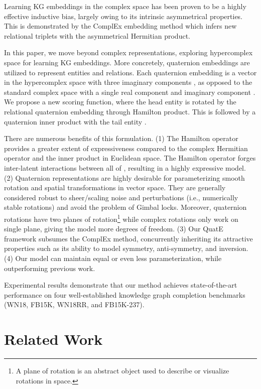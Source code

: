 \documentclass{article}
\begin{document}
Learning KG embeddings in the complex space  has been proven to be a highly effective inductive bias, largely owing to its intrinsic asymmetrical properties. This is demonstrated by the ComplEx embedding method which infers new relational triplets with the asymmetrical Hermitian product.

In this paper, we move beyond complex representations, exploring hypercomplex space for learning KG embeddings. More concretely, quaternion embeddings are utilized to represent entities and relations. Each quaternion embedding is a vector in the hypercomplex space  with three imaginary components , as opposed to the standard complex space  with a single real component  and imaginary component . We propose a new scoring function, where the head entity  is rotated by the relational quaternion embedding through Hamilton product. This is followed by a quaternion inner product with the tail entity .

There are numerous benefits of this formulation. (1) The Hamilton operator provides a greater extent of expressiveness compared to the complex Hermitian operator and the inner product in Euclidean space. The Hamilton operator forges inter-latent interactions between all of , resulting in a highly expressive model. (2) Quaternion representations are highly desirable for parameterizing smooth rotation and spatial transformations in vector space. They are generally considered robust to sheer/scaling noise and perturbations (i.e., numerically stable rotations) and avoid the problem of Gimbal locks. Moreover, quaternion rotations have two planes of rotation\footnote{A plane of rotation is an abstract object used to describe or visualize rotations in space.} while complex rotations only work on single plane, giving the model more degrees of freedom. (3) Our QuatE framework subsumes the ComplEx method, concurrently inheriting its attractive properties such as its ability to model symmetry, anti-symmetry, and inversion. (4) Our model can maintain equal or even less parameterization, while outperforming previous work.

Experimental results demonstrate that our method achieves state-of-the-art performance on four well-established knowledge graph completion benchmarks (WN18, FB15K, WN18RR, and FB15K-237).





\section{Related Work}
\end{document}
